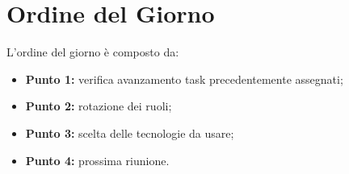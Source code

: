\section{Ordine del Giorno}
L'ordine del giorno è composto da: 
\begin{itemize}
	\item \textbf{Punto 1:} verifica avanzamento task precedentemente assegnati;
	\item \textbf{Punto 2:} rotazione dei ruoli;
	\item \textbf{Punto 3:} scelta delle tecnologie da usare;
	\item \textbf{Punto 4:} prossima riunione.
\end{itemize}
